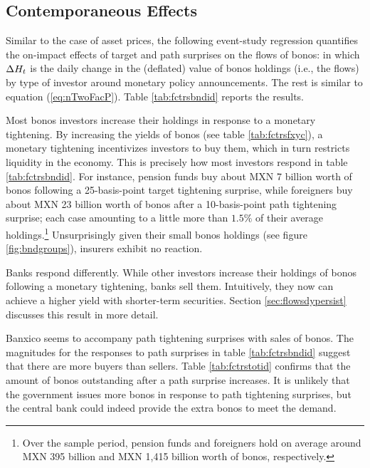 {\subsection{Contemporaneous Effects} \label{sec:onimpactflows}
Similar to the case of asset prices, the following event-study regression quantifies the on-impact effects of target and path surprises on the flows of bonos: 
\noindent in which \(\Delta H_{t}\) is the daily change in the (deflated) value of bonos holdings (i.e., the flows) by type of investor around monetary policy announcements. 
The rest is similar to equation (\ref{eq:nTwoFacP}). 
Table \ref{tab:fctrsbndid} reports the results.



Most bonos investors increase their holdings in response to a monetary tightening. 
By increasing the yields of bonos (see table \ref{tab:fctrsfxyc}), a monetary tightening incentivizes investors to buy them, which in turn restricts liquidity in the economy. 
This is precisely how most investors respond in table \ref{tab:fctrsbndid}. 
For instance, pension funds buy about MXN 7 billion worth of bonos following a 25-basis-point target tightening surprise, while foreigners buy about MXN 23 billion worth of bonos after a 10-basis-point path tightening surprise; 
each case amounting to a little more than \(1.5\%\) of their average holdings.\footnote{Over the sample period, pension funds and foreigners hold on average around MXN 395 billion and MXN 1,415 billion worth of bonos, respectively.} 
Unsurprisingly given their small bonos holdings (see figure \ref{fig:bndgroups}), insurers exhibit no reaction. 

Banks respond differently. While other investors increase their holdings of bonos following a monetary tightening, banks sell them. 
Intuitively, they now can achieve a higher yield with shorter-term securities. 
Section \ref{sec:flowsdypersist} discusses this result in more detail. 

Banxico seems to accompany path tightening surprises with sales of bonos. 
The magnitudes for the responses to path surprises in table \ref{tab:fctrsbndid} suggest that there are more buyers than sellers. 
Table \ref{tab:fctrstotid} confirms that the amount of bonos outstanding after a path surprise increases. It is unlikely that the government issues more bonos in response to path tightening surprises, but the central bank could indeed provide the extra bonos to meet the demand. 


}
